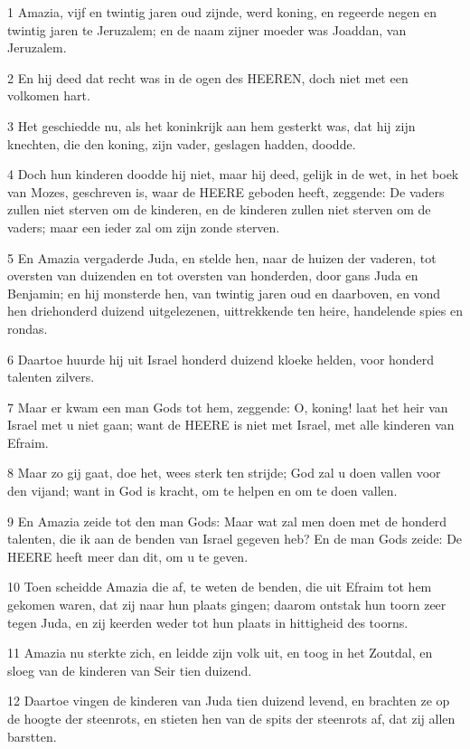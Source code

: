 \par 1 Amazia, vijf en twintig jaren oud zijnde, werd koning, en regeerde negen en twintig jaren te Jeruzalem; en de naam zijner moeder was Joaddan, van Jeruzalem.
\par 2 En hij deed dat recht was in de ogen des HEEREN, doch niet met een volkomen hart.
\par 3 Het geschiedde nu, als het koninkrijk aan hem gesterkt was, dat hij zijn knechten, die den koning, zijn vader, geslagen hadden, doodde.
\par 4 Doch hun kinderen doodde hij niet, maar hij deed, gelijk in de wet, in het boek van Mozes, geschreven is, waar de HEERE geboden heeft, zeggende: De vaders zullen niet sterven om de kinderen, en de kinderen zullen niet sterven om de vaders; maar een ieder zal om zijn zonde sterven.
\par 5 En Amazia vergaderde Juda, en stelde hen, naar de huizen der vaderen, tot oversten van duizenden en tot oversten van honderden, door gans Juda en Benjamin; en hij monsterde hen, van twintig jaren oud en daarboven, en vond hen driehonderd duizend uitgelezenen, uittrekkende ten heire, handelende spies en rondas.
\par 6 Daartoe huurde hij uit Israel honderd duizend kloeke helden, voor honderd talenten zilvers.
\par 7 Maar er kwam een man Gods tot hem, zeggende: O, koning! laat het heir van Israel met u niet gaan; want de HEERE is niet met Israel, met alle kinderen van Efraim.
\par 8 Maar zo gij gaat, doe het, wees sterk ten strijde; God zal u doen vallen voor den vijand; want in God is kracht, om te helpen en om te doen vallen.
\par 9 En Amazia zeide tot den man Gods: Maar wat zal men doen met de honderd talenten, die ik aan de benden van Israel gegeven heb? En de man Gods zeide: De HEERE heeft meer dan dit, om u te geven.
\par 10 Toen scheidde Amazia die af, te weten de benden, die uit Efraim tot hem gekomen waren, dat zij naar hun plaats gingen; daarom ontstak hun toorn zeer tegen Juda, en zij keerden weder tot hun plaats in hittigheid des toorns.
\par 11 Amazia nu sterkte zich, en leidde zijn volk uit, en toog in het Zoutdal, en sloeg van de kinderen van Seir tien duizend.
\par 12 Daartoe vingen de kinderen van Juda tien duizend levend, en brachten ze op de hoogte der steenrots, en stieten hen van de spits der steenrots af, dat zij allen barstten.
